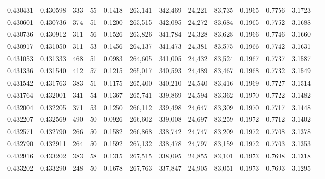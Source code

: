 \begin{tabular}{rrrrrrrrrrrrr}
0.430431 & 0.430598 &   333 &  55 &                                     0.1418 & 263,141 & 342,469 &  24,221 &  83,735 & 0.1965 & 0.7756 & 3.1723 \\
0.430601 & 0.430736 &   374 &  51 &                                     0.1200 & 263,515 & 342,095 &  24,272 &  83,684 & 0.1965 & 0.7752 & 3.1688 \\
0.430736 & 0.430912 &   311 &  56 &                                     0.1526 & 263,826 & 341,784 &  24,328 &  83,628 & 0.1966 & 0.7746 & 3.1660 \\
0.430917 & 0.431050 &   311 &  53 &                                     0.1456 & 264,137 & 341,473 &  24,381 &  83,575 & 0.1966 & 0.7742 & 3.1631 \\
0.431053 & 0.431333 &   468 &  51 &                                     0.0983 & 264,605 & 341,005 &  24,432 &  83,524 & 0.1967 & 0.7737 & 3.1587 \\
0.431336 & 0.431540 &   412 &  57 &                                     0.1215 & 265,017 & 340,593 &  24,489 &  83,467 & 0.1968 & 0.7732 & 3.1549 \\
0.431542 & 0.431763 &   383 &  51 &                                     0.1175 & 265,400 & 340,210 &  24,540 &  83,416 & 0.1969 & 0.7727 & 3.1514 \\
0.431764 & 0.432001 &   341 &  54 &                                     0.1367 & 265,741 & 339,869 &  24,594 &  83,362 & 0.1970 & 0.7722 & 3.1482 \\
0.432004 & 0.432205 &   371 &  53 &                                     0.1250 & 266,112 & 339,498 &  24,647 &  83,309 & 0.1970 & 0.7717 & 3.1448 \\
0.432207 & 0.432569 &   490 &  50 &                                     0.0926 & 266,602 & 339,008 &  24,697 &  83,259 & 0.1972 & 0.7712 & 3.1402 \\
0.432571 & 0.432790 &   266 &  50 &                                     0.1582 & 266,868 & 338,742 &  24,747 &  83,209 & 0.1972 & 0.7708 & 3.1378 \\
0.432790 & 0.432911 &   264 &  50 &                                     0.1592 & 267,132 & 338,478 &  24,797 &  83,159 & 0.1972 & 0.7703 & 3.1353 \\
0.432916 & 0.433202 &   383 &  58 &                                     0.1315 & 267,515 & 338,095 &  24,855 &  83,101 & 0.1973 & 0.7698 & 3.1318 \\
0.433202 & 0.433290 &   248 &  50 &                                     0.1678 & 267,763 & 337,847 &  24,905 &  83,051 & 0.1973 & 0.7693 & 3.1295 \\

\end{tabular}
